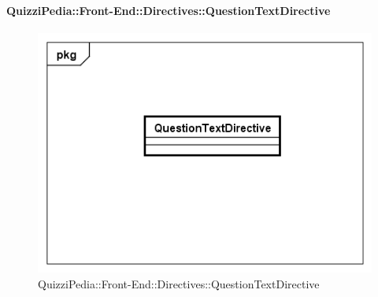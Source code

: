\paragraph{QuizziPedia::Front-End::Directives::QuestionTextDirective}

\label{QuizziPedia::Front-End::Directives::QuestionTextDirective}

\begin{figure}[ht]
	\centering
	\includegraphics[scale=0.5,keepaspectratio]{UML/Classi/Front-End/QuizziPedia_Front-end_Directives_QuestionTextDirective.png}
	\caption{QuizziPedia::Front-End::Directives::QuestionTextDirective}
\end{figure} \FloatBarrier


